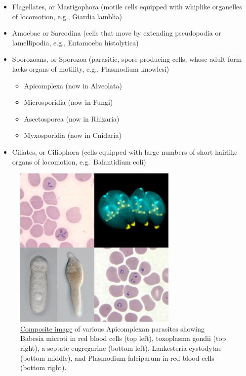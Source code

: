 \begin{itemize}
\tightlist
\item
  Flagellates, or Mastigophora (motile cells equipped with whiplike organelles of locomotion, e.g., Giardia lamblia)
\item
  Amoebae or Sarcodina (cells that move by extending pseudopodia or lamellipodia, e.g., Entamoeba histolytica)
\item
  Sporozoans, or Sporozoa (parasitic, spore-producing cells, whose adult form lacks organs of motility, e.g., Plasmodium knowlesi)

  \begin{itemize}
  \tightlist
  \item
    Apicomplexa (now in Alveolata)
  \item
    Microsporidia (now in Fungi)
  \item
    Ascetosporea (now in Rhizaria)
  \item
    Myxosporidia (now in Cnidaria)
  \end{itemize}
\item
  Ciliates, or Ciliophora (cells equipped with large numbers of short hairlike organs of locomotion, e.g.~Balantidium coli)
\end{itemize}



\begin{figure}

{\centering \includegraphics[width=0.7\linewidth]{./figures/protista/Apicomplexa_Composite_Image} 

}

\caption{\href{https://commons.wikimedia.org/wiki/File:Apicomplexa_Composite_Image.png}{Composite image} of various Apicomplexan parasites showing Babesia microti in red blood cells (top left), toxoplasma gondii (top right), a septate eugregarine (bottom left), Lankesteria cystodytae (bottom middle), and Plasmodium falciparum in red blood cells (bottom right).}\label{fig:apicomplexa}
\end{figure}

